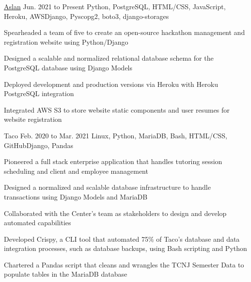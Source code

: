 
\begin{cventry}
    {\href{https://github.com/tcnj-acm/aslan}{Aslan}}{}
    {Jun. 2021 to Present}
    {Python, PostgreSQL, HTML/CSS, JavaScript, Heroku, AWS}{Django, Pyscopg2, boto3, django-storages}
    \begin{cvitems}
        \item Spearheaded a team of five to create an open-source hackathon management and registration website using Python/Django
        \item Designed a scalable and normalized relational database schema for the PostgreSQL database using Django Models
        \item Deployed development and production versions via Heroku with Heroku PostgreSQL integration
        \item Integrated AWS S3 to store website static components and user resumes for website registration

    \end{cvitems}
\end{cventry}

 \begin{cventry}
        {Taco}{}
        {Feb. 2020 to Mar. 2021}
        {Linux, Python, MariaDB, Bash, HTML/CSS, GitHub}{Django, Pandas}
        \begin{cvitems}
            \item Pioneered a full stack enterprise application that handles tutoring session scheduling and client and employee management
            \item Designed a normalized and scalable database infrastructure to handle transactions using Django Models and MariaDB
            \item Collaborated with the Center’s team as stakeholders to design and develop automated capabilities 
            \item Developed Crispy, a CLI tool that automated 75\% of Taco's database and data integration processes, such as database backups, using Bash scripting and Python 
            \item Chartered a Pandas script that cleans and wrangles the TCNJ Semester Data to populate tables in the MariaDB database
        \end{cvitems}  
\end{cventry}    

